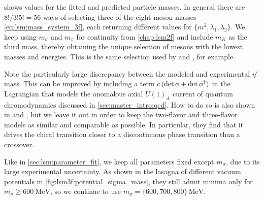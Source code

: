  shows values for the fitted and predicted particle masses.
In general there are $8!/3!5! = 56$ ways of selecting three of the eight meson masses \eqref{eq:lsm:mass_system_3f},
each returning different values for $\{m^2,\lambda_1,\lambda_2\}$.
We keep using $m_\sigma$ and $m_\pi$ for continuity from \cref{chap:lsm2f}
and include $m_K$ as the third mass, thereby obtaining the unique selection of mesons with the lowest masses and energies.
This is the same selection used by \cite{ref:lsm3f} and \cite{ref:lsm3f_details}, for example.

Note the particularly large discrepancy between the modeled and experimental $\eta'$ mass.
This can be improved by including a term $c \, (\operatorname{det}{\phi} + \operatorname{det}{\phi^\dagger})$ in the Lagrangian
that models the anomalous axial $U(1)_A$ current of quantum chromodynamics discussed in \cref{sec:master_intro:qcd}.
How to do so is also shown in \cite{ref:lsm3f} and \cite{ref:lsm3f_details},
but we leave it out in order to keep the two-flavor and three-flavor models as similar and comparable as possible.
In particular, they find that it drives the chiral transition closer to a discontinuous phase transition than a crossover.

Like in \cref{sec:lsm:parameter_fit},
we keep all parameters fixed except $m_\sigma$, due to its large experimental uncertainty.
As shown in the lasagna of different vacuum potentials in \cref{fig:lsm3f:potential_sigma_mass},
they still admit minima only for $m_\sigma \geq \SI{600}{\mega\electronvolt}$,
so we continue to use $m_\sigma=\{600,700,800\} \, \si{\mega\electronvolt}$.

